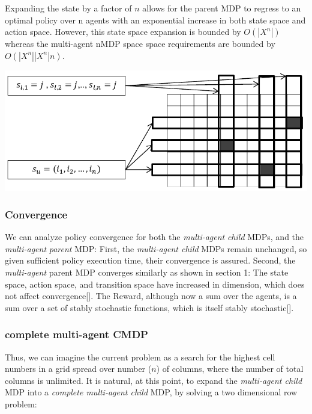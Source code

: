 \documentclass[compsoc,journal,letterpaper,10pt,draftcls,twocolumn]{IEEEtran}
\begin{document}
Expanding the state by a factor of \(n\) allows for the parent MDP to
regress to an optimal policy over \(\text{n\ }\)agents with an
exponential increase in both state space and action space. However, this
state space expansion is bounded by \(O(\left| X^{n} \right|)\) whereas
the multi-agent nMDP space space requirements are bounded by
\(O(\left| X^{n} \right|\left| X^{n} \right|n)\).

 
\includegraphics{media/figure8}
 


\subsubsection{Convergence}\label{convergence-1}

We can analyze policy convergence for both the \emph{multi-agent}
\emph{child} MDPs, and the \emph{multi-agent} \emph{parent} MDP: First,
the \emph{multi-agent child} MDPs remain unchanged, so given sufficient
policy execution time, their convergence is assured. Second, the
\emph{multi-agent} parent MDP converges similarly as shown in section 1:
The state space, action space, and transition space have increased in
dimension, which does not affect convergence{[}{]}. The Reward, although
now a sum over the agents, is a sum over a set of stably stochastic
functions, which is itself stably stochastic{[}{]}.

\subsubsection{complete multi-agent
CMDP}\label{complete-multi-agent-cmdp}

Thus, we can imagine the current problem as a search for the highest
cell numbers in a grid spread over number (\(n\)) of columns, where the
number of total columns is unlimited. It is natural, at this point, to
expand the \emph{multi-agent child} MDP into a \emph{complete
multi-agent child} MDP, by solving a two dimensional row problem:
\end{document}
